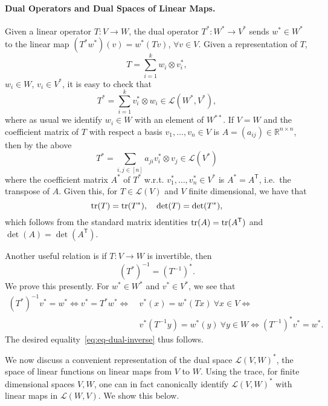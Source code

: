 \documentclass[11pt]{article}
\theoremstyle{plain}
\theoremstyle{plain}
\newcommand{\T}{\ensuremath{\mathsf{T}}}
\newcommand{\R}{\ensuremath{\mathbb{R}}}
\begin{document}
\paragraph{\bf Dual Operators and Dual Spaces of Linear Maps.} 

Given a linear operator $T: V \rightarrow W$, the dual operator $T^*: W^* \rightarrow
V^*$ sends $w^* \in W^*$ to the linear map $(T^* w^*)(v) = w^*(Tv)$, $\forall v
\in V$. Given a representation of $T$,
\[
T = \sum_{i=1}^k w_i \otimes v_i^*, 
\]
$w_i \in W$, $v_i \in V^*$, it is easy to check that
\[
T^* = \sum_{i=1}^k v_i^* \otimes w_i \in \mathcal{L}(W^*,V^*),
\] 
where as usual we identify $w_i \in W$ with an element of $W^{**}$. If $V=W$ and
the coefficient matrix of $T$ with respect a basis $v_1,\dots,v_n \in V$ is
$A=(a_{ij}) \in \R^{n \times n}$, then by the above
\[
T^* = \sum_{i,j \in [n]} a_{ji} v_i^* \otimes v_j \in \mathcal{L}(V^*)
\]
where the coefficient matrix $A^*$ of $T^*$ w.r.t. $v_1^*,\dots,v_n^* \in V^*$
is $A^* = A^\T$, i.e.~the transpose of $A$. Given this, for $T \in
\mathcal{L}(V)$ and $V$ finite dimensional, we have that
\[
{\rm tr}(T) = {\rm tr}(T^*), \quad \det(T) = \det(T^*),
\] 
which follows from the standard matrix identities ${\rm tr}(A) = {\rm tr}(A^\T)$
and $\det(A) = \det(A^\T)$.

Another useful relation is if $T: V \rightarrow W$ is invertible, then
\begin{equation}
\label{eq:eq-dual-inverse}
(T^{*})^{-1} = (T^{-1})^*.
\end{equation}
We prove this presently. For $w^* \in W^*$ and $v^* \in V^*$, we see that
\begin{align*}
(T^*)^{-1} v^* = w^* \Leftrightarrow
v^* = T^* w^*  \Leftrightarrow
&~v^*(x) = w^*(T x) ~ \forall x \in V \Leftrightarrow \\
&~v^*(T^{-1} y)= w^*(y)  ~ \forall y \in W \Leftrightarrow (T^{-1})^* v^* = w^*.
\end{align*}
The desired equality~\eqref{eq:eq-dual-inverse} thus follows.

We now discuss a convenient representation of the dual space
$\mathcal{L}(V,W)^*$, the space of linear functions on linear maps from $V$ to
$W$. Using the trace, for finite dimensional spaces $V,W$, one can in fact
canonically identify $\mathcal{L}(V,W)^*$ with linear maps in
$\mathcal{L}(W,V)$. We show this below. 
\end{document}

